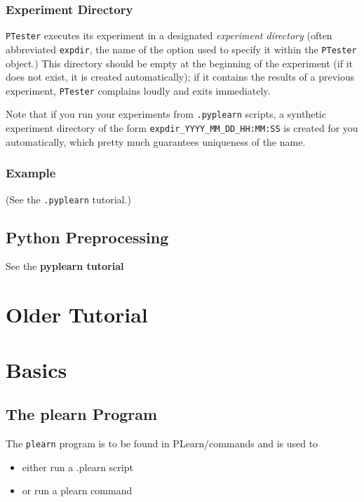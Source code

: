 \documentclass[11pt]{book}
\begin{document}
\subsection{Experiment Directory}

\verb|PTester| executes its experiment in a designated \emph{experiment
  directory} (often abbreviated \verb|expdir|, the name of the option used
to specify it within the \verb|PTester| object.)  This directory should be
empty at the beginning of the experiment (if it does not exist, it is
created automatically); if it contains the results of a previous
experiment, \verb|PTester| complains loudly and exits immediately.

Note that if you run your experiments from \verb|.pyplearn| scripts, a
synthetic experiment directory of the form
\verb|expdir_YYYY_MM_DD_HH:MM:SS| is created for you automatically, which
pretty much guarantees uniqueness of the name.

\subsection{Example}

(See the \verb|.pyplearn| tutorial.)

\fi

\section{Python Preprocessing}

See the {\bf pyplearn tutorial}

\chapter{Older Tutorial}




\chapter{Basics}

\section{The plearn Program}

The {\tt plearn} program is to be found in PLearn/commands and is used to
\begin{itemize}
\item either run a .plearn script 
\item or run a plearn command
\end{itemize}
\end{document}

